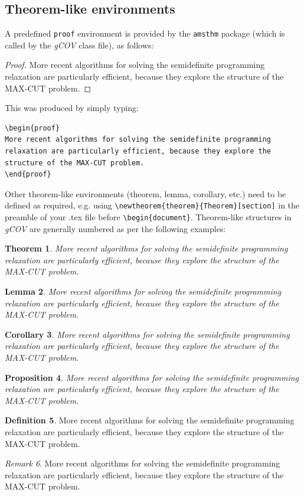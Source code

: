\documentclass{gCOV2e}
\theoremstyle{plain}%
\newtheorem{theorem}{Theorem}[section]
\newtheorem{corollary}[theorem]{Corollary}
\newtheorem{lemma}[theorem]{Lemma}
\newtheorem{proposition}[theorem]{Proposition}
\theoremstyle{definition}
\newtheorem{definition}[theorem]{Definition}
\theoremstyle{remark}
\newtheorem{remark}[theorem]{Remark}
\begin{document}
\subsection{Theorem-like environments}

A predefined \verb"proof" environment is provided by the \texttt{amsthm} package (which is called by the \textit{gCOV} class file), as follows:

\begin{proof}
More recent algorithms for solving the semidefinite programming
relaxation are particularly efficient, because they explore the
structure of the MAX-CUT problem.
\end{proof}
\noindent This was produced by simply typing:
\begin{verbatim}
\begin{proof}
More recent algorithms for solving the semidefinite programming
relaxation are particularly efficient, because they explore the
structure of the MAX-CUT problem.
\end{proof}
\end{verbatim}
Other theorem-like environments (theorem, lemma, corollary, etc.) need to be defined as required, e.g. using \verb"\newtheorem{theorem}{Theorem}[section]"
in the preamble of your .tex file before \verb"\begin{document}". Theorem-like structures in \textit{gCOV} are generally numbered as per the following examples:

\begin{theorem}
More recent algorithms for solving the semidefinite programming
relaxation are particularly efficient, because they explore the
structure of the MAX-CUT problem.
\end{theorem}
\begin{lemma}
More recent algorithms for solving the semidefinite programming
relaxation are particularly efficient, because they explore the
structure of the MAX-CUT problem.
\end{lemma}
\begin{corollary}
More recent algorithms for solving the semidefinite programming
relaxation are particularly efficient, because they explore the
structure of the MAX-CUT problem.
\end{corollary}
\begin{proposition}
More recent algorithms for solving the semidefinite programming
relaxation are particularly efficient, because they explore the
structure of the MAX-CUT problem.
\end{proposition}
\begin{definition}
More recent algorithms for solving the semidefinite programming
relaxation are particularly efficient, because they explore the
structure of the MAX-CUT problem.
\end{definition}
\begin{remark}
More recent algorithms for solving the semidefinite programming
relaxation are particularly efficient, because they explore the
structure of the MAX-CUT problem.
\end{remark}
\end{document}
